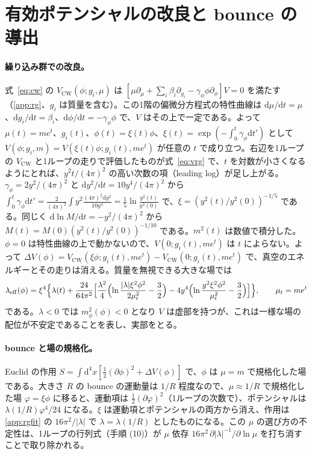 \documentclass[a4paper,10pt]{ltjsarticle}
\newcommand{\dd}{\mathrm{d}}
\begin{document}
\section{有効ポテンシャルの改良と bounce の導出}\label{app:bounce}

\paragraph{繰り込み群での改良。}式~\eqref{eq:cw} の $V_{\mathrm{CW}}(\phi;g_i,\mu)$ は $[\mu\partial_\mu+\sum_i\beta_i\partial_{g_i}-\gamma_\phi\phi\partial_\phi]V=0$ を満たす（\ref{app:rg}、$g_i$ は質量を含む）。この1階の偏微分方程式の特性曲線は $\dd\mu/\dd t=\mu$、$\dd g_i/\dd t=\beta_i$、$\dd\phi/\dd t=-\gamma_\phi\phi$ で、$V$ はその上で一定である。よって $\mu(t)=me^t$、$g_i(t)$、$\phi(t)=\xi(t)\phi$、$\xi(t)=\exp(-\int_0^t\gamma_\phi\dd t')$ として $V(\phi;g_i,m)=V(\xi(t)\phi;g_i(t),me^t)$ が任意の $t$ で成り立つ。右辺を1ループの $V_{\mathrm{CW}}$ と1ループの走りで評価したものが式~\eqref{eq:vrg} で、$t$ を対数が小さくなるようにとれば、$y^2t/(4\pi)^2$ の高い次数の項（leading log）が足し上がる。$\gamma_\phi=2y^2/(4\pi)^2$ と $\dd y^2/\dd t=10y^4/(4\pi)^2$ から $\int_0^t\gamma_\phi\dd t'=\frac{2}{(4\pi)^2}\int y^2\frac{(4\pi)^2\dd y^2}{10y^4}=\frac15\ln\frac{y^2(t)}{y^2(0)}$ で、$\xi=(y^2(t)/y^2(0))^{-1/5}$ である。同じく $\dd\ln M/\dd t=-y^2/(4\pi)^2$ から $M(t)=M(0)(y^2(t)/y^2(0))^{-1/10}$ である。$m^2(t)$ は数値で積分した。$\phi=0$ は特性曲線の上で動かないので、$V(0;g_i(t),me^t)$ は $t$ によらない。よって $\Delta V(\phi)=V_{\mathrm{CW}}(\xi\phi;g_i(t),me^t)-V_{\mathrm{CW}}(0;g_i(t),me^t)$ で、真空のエネルギーとその走りは消える。質量を無視できる大きな場では
\begin{equation*}
\lambda_{\mathrm{eff}}(\phi)=\xi^4\Bigl\{\lambda(t)+\frac{24}{64\pi^2}\Bigl[\frac{\lambda^2}{4}\Bigl(\ln\frac{|\lambda|\xi^2\phi^2}{2\mu_t^2}-\frac32\Bigr)-4y^4\Bigl(\ln\frac{y^2\xi^2\phi^2}{\mu_t^2}-\frac32\Bigr)\Bigr]\Bigr\},\qquad\mu_t=me^t
\end{equation*}
である。$\lambda<0$ では $m_\phi^2(\phi)<0$ となり $V$ は虚部を持つが、これは一様な場の配位が不安定であることを表し、実部をとる。

\paragraph{bounce と場の規格化。}Euclid の作用 $S=\int\dd^4x[\frac12(\partial\phi)^2+\Delta V(\phi)]$ で、$\phi$ は $\mu=m$ で規格化した場である。大きさ $R$ の bounce の運動量は $1/R$ 程度なので、$\mu\approx1/R$ で規格化した場 $\varphi=\xi\phi$ に移ると、運動項は $\frac12(\partial\varphi)^2$（1ループの次数で）、ポテンシャルは $\lambda(1/R)\varphi^4/24$ になる。$\xi$ は運動項とポテンシャルの両方から消え、作用は\ref{app:rgfit} の $16\pi^2/|\lambda|$ で $\lambda=\lambda(1/R)$ としたものになる。この $\mu$ の選び方の不定性は、1ループの行列式（手順 (10)）が $\mu$ 依存 $16\pi^2\,\partial|\lambda|^{-1}/\partial\ln\mu$ を打ち消すことで取り除かれる。
\end{document}
